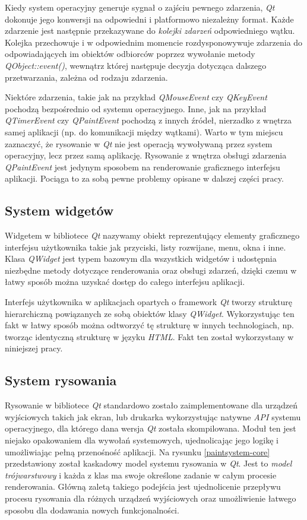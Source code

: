 Kiedy system operacyjny generuje sygnał o zajściu pewnego zdarzenia, \emph{Qt} dokonuje jego konwersji na odpowiedni i platformowo niezależny format. Każde zdarzenie jest następnie przekazywane do \emph{kolejki zdarzeń} odpowiedniego wątku. Kolejka przechowuje i w odpowiednim momencie rozdysponowywuje zdarzenia do odpowiadających im obiektów odbiorców poprzez wywołanie metody \emph{QObject::event()}, wewnątrz której następuje decyzja dotycząca dalszego przetwarzania, zależna od rodzaju zdarzenia. 

Niektóre zdarzenia, takie jak na przykład \emph{QMouseEvent} czy \emph{QKeyEvent} pochodzą bezpośrednio od systemu operacyjnego. Inne, jak na przykład \emph{QTimerEvent} czy \emph{QPaintEvent} pochodzą z innych źródeł, nierzadko z wnętrza samej aplikacji (np. do komunikacji między wątkami). Warto w tym miejscu zaznaczyć, że rysowanie w \emph{Qt} nie jest operacją wywoływaną przez system operacyjny, lecz przez samą aplikację. Rysowanie z wnętrza obsługi zdarzenia \emph{QPaintEvent} jest jedynym sposobem na renderowanie graficznego interfejsu aplikacji. Pociąga to za sobą pewne problemy opisane w dalszej części pracy.

\subsection{System widgetów}
Widgetem w bibliotece \emph{Qt} nazywamy obiekt reprezentujący elementy graficznego interfejsu użytkownika takie jak przyciski, listy rozwijane, menu, okna i inne. Klasa \emph{QWidget}\cite{qwidget} jest typem bazowym dla wszystkich widgetów i udostępnia niezbędne metody dotyczące renderowania oraz obsługi zdarzeń, dzięki czemu w łatwy sposób można uzyskać dostęp do całego interfejsu aplikacji.

Interfejs użytkownika w aplikacjach opartych o framework \emph{Qt} tworzy strukturę hierarchiczną powiązanych ze sobą obiektów klasy \emph{QWidget}. Wykorzystując ten fakt w łatwy sposób można odtworzyć tę strukturę w innych technologiach, np. tworząc identyczną strukturę w języku \emph{HTML}. Fakt ten został wykorzystany w niniejszej pracy.

\subsection{System rysowania}
\label{system_rysowania}
Rysowanie w bibliotece \emph{Qt} standardowo zostało zaimplementowane dla urządzeń wyjściowych takich jak ekran, lub drukarka wykorzystując natywne \emph{API} systemu operacyjnego, dla którego dana wersja \emph{Qt} została skompilowana. Moduł ten jest niejako opakowaniem dla wywołań systemowych, ujednolicając jego logikę i umożliwiając pełną przenośność aplikacji. Na rysunku \ref{paintsystem-core} przedstawiony został kaskadowy model systemu rysowania w \emph{Qt}. Jest to \emph{model trójwarstwowy} i każda z klas ma swoje określone zadanie w całym procesie renderowania. Główną zaletą takiego podejścia jest ujednolicenie przepływu procesu rysowania dla różnych urządzeń wyjściowych oraz umożliwienie łatwego sposobu dla dodawania nowych funkcjonalności.

